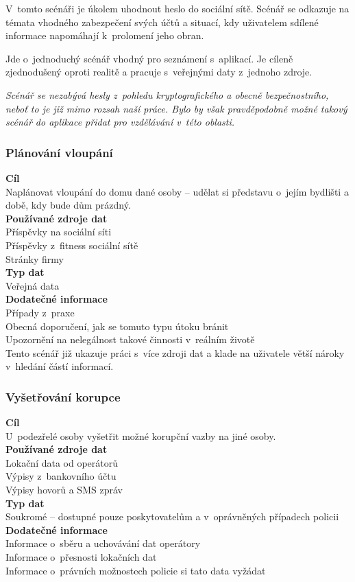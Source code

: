 V~tomto scénáři je úkolem uhodnout heslo do sociální sítě. Scénář se odkazuje na témata vhodného zabezpečení svých účtů a situací, kdy uživatelem sdílené informace napomáhají k~prolomení jeho obran.

Jde o~jednoduchý scénář vhodný pro seznámení s~aplikací. Je cíleně zjednodušený oproti realitě a pracuje s~veřejnými daty z~jednoho zdroje.

\textit{Scénář se nezabývá hesly z~pohledu kryptografického a obecně bezpečnostního, neboť to je již mimo rozsah naší práce. Bylo by však pravděpodobně možné takový scénář do aplikace přidat pro vzdělávání v~této oblasti.}


\subsubsection*{Plánování vloupání}
\textbf{Cíl}\\
Naplánovat vloupání do domu dané osoby -- udělat si představu o~jejím bydlišti a době, kdy bude dům prázdný.\\
\textbf{Používané zdroje dat}\\
Příspěvky na sociální síti\\
Příspěvky z~fitness sociální sítě\\
Stránky firmy\\
\textbf{Typ dat}\\
Veřejná data\\
\textbf{Dodatečné informace}\\
Případy z~praxe\\
Obecná doporučení, jak se tomuto typu útoku bránit\\ 
Upozornění na nelegálnost takové činnosti v~reálním životě\\

Tento scénář již ukazuje práci s~více zdroji dat a klade na uživatele větší nároky v~hledání částí informací.


\subsubsection*{Vyšetřování korupce}
\textbf{Cíl}\\
U~podezřelé osoby vyšetřit možné korupční vazby na jiné osoby.\\
\textbf{Používané zdroje dat}\\
Lokační data od operátorů\\
Výpisy z~bankovního účtu\\
Výpisy hovorů a SMS zpráv\\
\textbf{Typ dat}\\
Soukromé -- dostupné pouze poskytovatelům a v~oprávněných případech policii\\
\textbf{Dodatečné informace}\\
Informace o~sběru a uchovávání dat operátory\\
Informace o~přesnosti lokačních dat\\
Informace o~právních možnostech policie si tato data vyžádat\\


